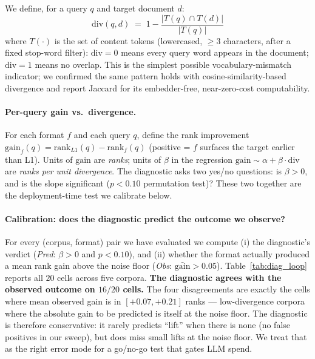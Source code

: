 \documentclass[11pt]{article}
\begin{document}
We define, for a query $q$ and target document $d$:
\[
  \mathrm{div}(q, d) \;=\; 1 - \frac{|T(q) \cap T(d)|}{|T(q)|}
\]
where $T(\cdot)$ is the set of content tokens (lowercased, $\geq 3$
characters, after a fixed stop-word filter): $\mathrm{div}=0$ means
every query word appears in the document; $\mathrm{div}=1$ means no
overlap. This is the simplest possible vocabulary-mismatch indicator;
we confirmed the same pattern holds with cosine-similarity-based
divergence and report Jaccard for its embedder-free, near-zero-cost
computability.

\paragraph{Per-query gain vs.\ divergence.} For each format $f$ and
each query $q$, define the rank improvement $\mathrm{gain}_f(q) =
\mathrm{rank}_{L1}(q) - \mathrm{rank}_f(q)$ (positive = $f$ surfaces
the target earlier than L1). Units of $\mathrm{gain}$ are
\emph{ranks}; units of $\beta$ in the regression
$\mathrm{gain} \sim \alpha + \beta \cdot \mathrm{div}$ are
\emph{ranks per unit divergence}. The diagnostic asks two yes/no
questions: is $\beta>0$, and is the slope significant
($p<0.10$ permutation test)? These two together are the
deployment-time test we calibrate below.

\paragraph{Calibration: does the diagnostic predict the outcome we
observe?} For every (corpus, format) pair we have evaluated we
compute (i) the diagnostic's verdict (\emph{Pred}: $\beta>0$ and
$p<0.10$), and (ii) whether the format actually produced a mean
rank gain above the noise floor (\emph{Obs}: $\bar{\mathrm{gain}}>0.05$).
Table~\ref{tab:diag_loop} reports all $20$ cells across five
corpora. \textbf{The diagnostic agrees with the observed outcome on
$16/20$ cells.} The four disagreements are exactly the cells where
mean observed gain is in $[+0.07, +0.21]$ ranks --- low-divergence
corpora where the absolute gain to be predicted is itself at the
noise floor. The diagnostic is therefore conservative: it rarely
predicts ``lift'' when there is none (no false positives in our
sweep), but does miss small lifts at the noise floor. We treat that
as the right error mode for a go/no-go test that gates LLM spend.
\end{document}
